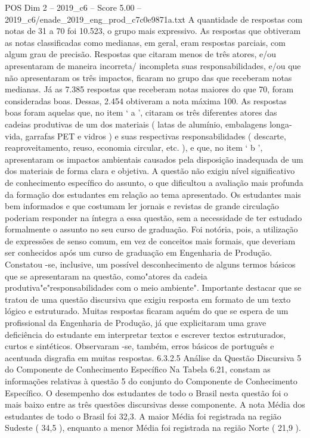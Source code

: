 \begin{textsample}{POS Dim 2 – 2019\_c6 – Score 5.00 – 2019\_c6/enade\_2019\_eng\_prod\_c7c0e9871a.txt}
A quantidade de respostas com notas de 31 a 70 foi 10.523, o grupo mais expressivo.
As respostas que obtiveram as notas classificadas como medianas, em geral, eram respostas parciais, com algum grau de precisão.
Respostas que citaram menos de três atores, e/ou apresentaram de maneira incorreta/ incompleta suas responsabilidades, e/ou que não apresentaram os três impactos, ficaram no grupo das que receberam notas medianas.
Já as 7.385 respostas que receberam notas maiores do que 70, foram consideradas boas.
Dessas, 2.454 obtiveram a nota máxima 100.
As respostas boas foram aquelas que, no item ‘ a ’, citaram os três diferentes atores das cadeias produtivas de um dos materiais ( latas de alumínio, embalagens longa-vida, garrafas PET e vidros ) e suas respectivas responsabilidades ( descarte, reaproveitamento, reuso, economia circular, etc. ), e que, no item ‘ b ’, apresentaram os impactos ambientais causados pela disposição inadequada de um dos materiais de forma clara e objetiva.
A questão não exigiu nível significativo de conhecimento específico do assunto, o que dificultou a avaliação mais profunda da formação dos estudantes em relação ao tema apresentado.
Os estudantes mais bem informados e que costumam ler jornais e revistas de grande circulação poderiam responder na íntegra a essa questão, sem a necessidade de ter estudado formalmente o assunto no seu curso de graduação.
Foi notória, pois, a utilização de expressões de senso comum, em vez de conceitos mais formais, que deveriam ser conhecidos após um curso de graduação em Engenharia de Produção.
Constatou -se, inclusive, um possível desconhecimento de alguns termos básicos que se apresentaram na questão, como"atores da cadeia produtiva"e"responsabilidades com o meio ambiente".
Importante destacar que se tratou de uma questão discursiva que exigiu resposta em formato de um texto lógico e estruturado.
Muitas respostas ficaram aquém do que se espera de um profissional da Engenharia de Produção, já que explicitaram uma grave deficiência do estudante em interpretar textos e escrever textos estruturados, curtos e sintéticos.
Observaram -se, também, erros básicos de português e acentuada disgrafia em muitas respostas. 6.3.2.5 Análise da Questão Discursiva 5 do Componente de Conhecimento Específico Na Tabela 6.21, constam as informações relativas à questão 5 do conjunto do Componente de Conhecimento Específico.
O desempenho dos estudantes de todo o Brasil nesta questão foi o mais baixo entre as três questões discursivas desse componente.
A nota Média dos estudantes de todo o Brasil foi 32,3.
A maior Média foi registrada na região Sudeste ( 34,5 ), enquanto a menor Média foi registrada na região Norte ( 21,9 ).

\end{textsample}
